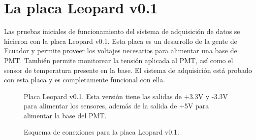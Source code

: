 \documentclass[a4paper,11pt]{article}
\begin{document}
\section{La placa Leopard v0.1}

Las pruebas iniciales de funcionamiento del sistema de adquisición de datos se
hicieron con la placa Leopard v0.1. Esta placa es un desarrollo de la gente de
Ecuador y permite proveer los voltajes necesarios para alimentar una base de
PMT. También permite monitorear la tensión aplicada al PMT, así como el sensor
de temperatura presente en la base. El sistema de adquisición está probado con
esta placa y es completamente funcional con ella.

\begin{figure}[!h]
  \centering
  \caption{Placa Leopard v0.1. Esta versión tiene las salidas de +3.3V y -3.3V
para alimentar los sensores, además de la salida de +5V para alimentar la base
del PMT.}
  \label{fig:leopard_photo}
\end{figure}

\begin{figure}[!h]
  \centering
  \caption{Esquema de conexiones para la placa Leopard v0.1.}
  \label{fig:leopard_sch}
\end{figure}
\end{document}
